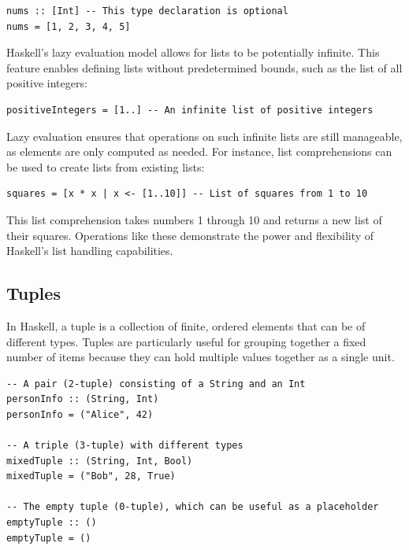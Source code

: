 \documentclass[a4paper, 10pt]{article}
\begin{document}
        \lstset{language=Haskell}
        \begin{lstlisting}
nums :: [Int] -- This type declaration is optional
nums = [1, 2, 3, 4, 5]
        \end{lstlisting}

        \noindent Haskell's lazy evaluation model allows for lists to be potentially infinite. This feature enables defining lists without predetermined bounds, such as the list of all positive integers:

        \begin{lstlisting}
positiveIntegers = [1..] -- An infinite list of positive integers
        \end{lstlisting}

        \noindent Lazy evaluation ensures that operations on such infinite lists are still manageable, as elements are only computed as needed. For instance, list comprehensions can be used to create lists from existing lists:

        \begin{lstlisting}
squares = [x * x | x <- [1..10]] -- List of squares from 1 to 10
        \end{lstlisting}

        \noindent This list comprehension takes numbers 1 through 10 and returns a new list of their squares. Operations like these demonstrate the power and flexibility of Haskell's list handling capabilities.

        \newpage

        \subsection{Tuples}

            In Haskell, a tuple is a collection of finite, ordered elements that can be of different types. Tuples are particularly useful for grouping together a fixed number of items because they can hold multiple values together as a single unit.

            \begin{lstlisting}
-- A pair (2-tuple) consisting of a String and an Int
personInfo :: (String, Int)
personInfo = ("Alice", 42)

-- A triple (3-tuple) with different types
mixedTuple :: (String, Int, Bool)
mixedTuple = ("Bob", 28, True)

-- The empty tuple (0-tuple), which can be useful as a placeholder
emptyTuple :: ()
emptyTuple = ()
            \end{lstlisting}
\end{document}

